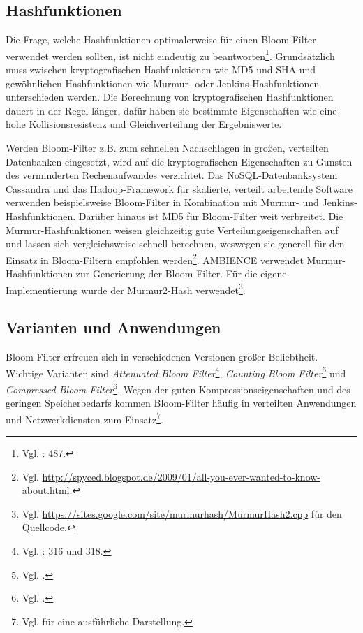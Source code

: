 \subsection{Hashfunktionen}\label{sec:hashfunktionen}
Die Frage, welche Hashfunktionen optimalerweise für einen Bloom-Filter verwendet werden sollten, ist nicht eindeutig zu beantworten\footnote{Vgl. \cite{Broder2004}: 487.}. Grundsätzlich muss zwischen kryptografischen Hashfunktionen wie MD5 und SHA und gewöhnlichen Hashfunktionen wie Murmur- oder Jenkins-Hashfunktionen unterschieden werden. Die Berechnung von kryptografischen Hashfunktionen dauert in der Regel länger, dafür haben sie bestimmte Eigenschaften wie eine hohe Kollisionsresistenz und Gleichverteilung der Ergebniswerte. 

Werden Bloom-Filter z.B. zum schnellen Nachschlagen in großen, verteilten Datenbanken eingesetzt, wird auf die kryptografischen Eigenschaften zu Gunsten des verminderten Rechenaufwandes verzichtet. Das NoSQL-Datenbanksystem Cassandra und das Hadoop-Framework für skalierte, verteilt arbeitende Software verwenden beispielsweise Bloom-Filter in Kombination mit Murmur- und Jenkins-Hashfunktionen. Darüber hinaus ist MD5 für Bloom-Filter weit verbreitet. Die Murmur-Hashfunktionen weisen gleichzeitig gute Verteilungseigenschaften auf und lassen sich vergleichsweise schnell berechnen, weswegen sie generell für den Einsatz in Bloom-Filtern empfohlen werden\footnote{Vgl. \url{http://spyced.blogspot.de/2009/01/all-you-ever-wanted-to-know-about.html}.}. AMBIENCE verwendet Murmur-Hashfunktionen zur Generierung der Bloom-Filter. Für die eigene Implementierung wurde der Murmur2-Hash verwendet\footnote{Vgl. \url{https://sites.google.com/site/murmurhash/MurmurHash2.cpp} für den Quellcode.}.  
\subsection{Varianten und Anwendungen}\label{sec:bloom-anwendungen}
Bloom-Filter erfreuen sich in verschiedenen Versionen großer Beliebtheit. Wichtige Varianten sind \textit{Attenuated Bloom Filter}\footnote{Vgl. \cite{Sakuma2011}: 316 und 318.}, \textit{Counting Bloom Filter}\footnote{Vgl. \cite{Fan2000}.} und \textit{Compressed Bloom Filter}\footnote{Vgl. \cite{Mitzenmacher2002}.}. Wegen der guten Kompressionseigenschaften und des geringen Speicherbedarfs kommen Bloom-Filter häufig in verteilten Anwendungen und Netzwerkdiensten zum Einsatz\footnote{Vgl. \cite{Broder2004} für eine ausführliche Darstellung.}. 

